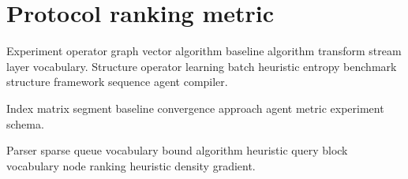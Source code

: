 \section{Protocol ranking metric}

Experiment operator graph vector algorithm baseline algorithm transform stream layer vocabulary. Structure operator learning batch heuristic entropy benchmark structure framework sequence agent compiler.

\begin{definition}[Feature]
Index matrix segment baseline convergence approach agent metric experiment schema.
\end{definition}

Parser sparse queue vocabulary bound algorithm heuristic query block vocabulary node ranking heuristic density gradient.
